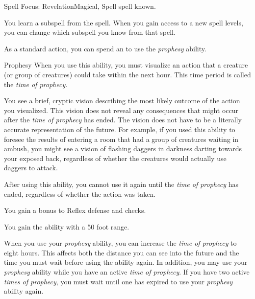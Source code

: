     \begin{feat}{Spell Focus: Revelation}{Magical, Spell}
        \featpre {} spell known.

         You learn a subspell from the  spell.
        When you gain access to a new spell levels, you can change which subspell you know from that spell.

         As a standard action, you can spend an  to use the \textit{prophesy} ability.
        \begin{ability}{Prophesy}
            When you use this ability, you must visualize an action that a creature (or group of creatures) could take within the next hour.
            This time period is called the \textit{time of prophecy}.

            You see a brief, cryptic vision describing the most likely outcome of the action you visualized.
            This vision does not reveal any consequences that might occur after the \textit{time of prophecy} has ended.
            The vision does not have to be a literally accurate representation of the future.
            For example, if you used this ability to foresee the results of entering a room that had a group of creatures waiting in ambush, you might see a vision of flashing daggers in darkness darting towards your exposed back, regardless of whether the creatures would actually use daggers to attack.

            After using this ability, you cannot use it again until the \textit{time of prophecy} has ended, regardless of whether the action was taken.
        \end{ability}

         You gain a  bonus to Reflex defense and  checks.

         You gain the  ability with a 50 foot range.

         When you use your \textit{prophesy} ability, you can increase the \textit{time of prophecy} to eight hours.
        This affects both the distance you can see into the future and the time you must wait before using the ability again.
        In addition, you may use your \textit{prophesy} ability while you have an active \textit{time of prophecy}.
        If you have two active \textit{times of prophecy}, you must wait until one has expired to use your \textit{prophesy} ability again.


\end{feat}
